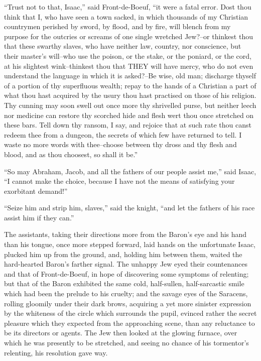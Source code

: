 ``Trust not to that, Isaac,'' said Front-de-Boeuf, ``it were a fatal
error. Dost thou think that I, who have seen a town sacked, in which
thousands of my Christian countrymen perished by sword, by flood, and by
fire, will blench from my purpose for the outcries or screams of one
single wretched Jew?--or thinkest thou that these swarthy slaves, who
have neither law, country, nor conscience, but their master's will--who
use the poison, or the stake, or the poniard, or the cord, at his
slightest wink--thinkest thou that THEY will have mercy, who do not even
understand the language in which it is asked?--Be wise, old man;
discharge thyself of a portion of thy superfluous wealth; repay to the
hands of a Christian a part of what thou hast acquired by the usury thou
hast practised on those of his religion. Thy cunning may soon swell out
once more thy shrivelled purse, but neither leech nor medicine can
restore thy scorched hide and flesh wert thou once stretched on these
bars. Tell down thy ransom, I say, and rejoice that at such rate thou
canst redeem thee from a dungeon, the secrets of which few have returned
to tell. I waste no more words with thee--choose between thy dross and
thy flesh and blood, and as thou choosest, so shall it be.''

``So may Abraham, Jacob, and all the fathers of our people assist me,''
said Isaac, ``I cannot make the choice, because I have not the means of
satisfying your exorbitant demand!''

``Seize him and strip him, slaves,'' said the knight, ``and let the
fathers of his race assist him if they can.''

The assistants, taking their directions more from the Baron's eye and
his hand than his tongue, once more stepped forward, laid hands on the
unfortunate Isaac, plucked him up from the ground, and, holding him
between them, waited the hard-hearted Baron's farther signal. The
unhappy Jew eyed their countenances and that of Front-de-Boeuf, in hope
of discovering some symptoms of relenting; but that of the Baron
exhibited the same cold, half-sullen, half-sarcastic smile which had
been the prelude to his cruelty; and the savage eyes of the Saracens,
rolling gloomily under their dark brows, acquiring a yet more sinister
expression by the whiteness of the circle which surrounds the pupil,
evinced rather the secret pleasure which they expected from the
approaching scene, than any reluctance to be its directors or agents.
The Jew then looked at the glowing furnace, over which he was presently
to be stretched, and seeing no chance of his tormentor's relenting, his
resolution gave way.

